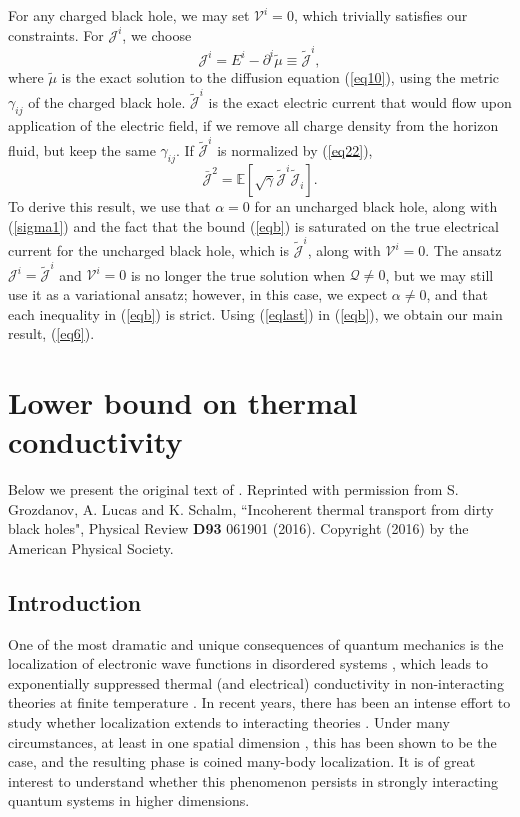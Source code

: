 \documentclass[10pt, oneside]{book}
\begin{document}
\begin{doublespace}
For any charged black hole, we may set $\mathcal{V}^i=0$, which trivially satisfies our constraints.   For $\mathcal{J}^i$, we choose 
\begin{equation}
{\mathcal{J}}^i = E^i - \partial^i  \tilde\mu \equiv \tilde{\mathcal{J}}^i ,  \label{eq33}
\end{equation}
where $\tilde\mu$ is the exact solution to the diffusion equation (\ref{eq10}), using the metric $\gamma_{ij}$ of the charged black hole.    $\tilde{\mathcal{J}}^i$ is the exact electric current that would flow upon application of the electric field, if we remove all charge density from the horizon fluid, but keep the same $\gamma_{ij}$.   
If $\tilde{\mathcal{J}}^i$ is normalized by (\ref{eq22}), \begin{equation}
\bar{\mathcal{J}}^2 = \mathbb{E}\left[\sqrt{\gamma} \tilde{\mathcal{J}}^i\tilde{\mathcal{J}}_{i}\right].  \label{eqlast}
\end{equation}
To derive this result, we use that $\alpha=0$ for an uncharged black hole, along with (\ref{sigma1}) and the fact that the bound (\ref{eqb}) is saturated on the true electrical current for the uncharged black hole, which is $\tilde{\mathcal{J}}^i$, along with $\mathcal{V}^i=0$.   The ansatz $\mathcal{J}^i=\tilde{\mathcal{J}}^i$ and $\mathcal{V}^i=0$ is no longer the true solution when $\mathcal{Q}\ne 0$, but we may still use it as a variational ansatz;  however, in this case, we expect $\alpha\ne 0$, and that each inequality in (\ref{eqb}) is strict.  
Using (\ref{eqlast}) in (\ref{eqb}), we obtain our main result, (\ref{eq6}).


\chapter{Lower bound on thermal conductivity}

Below we present the original text of \cite{Grozdanov2}.  Reprinted with permission from S. Grozdanov, A. Lucas and K. Schalm,  ``Incoherent thermal transport from dirty black holes",  Physical Review \textbf{D93} 061901 (2016).   Copyright (2016) by the American Physical Society.

\section{Introduction}
One of the most dramatic and unique consequences of quantum mechanics is the localization of electronic wave functions in disordered systems \cite{anderson}, which leads to exponentially suppressed thermal (and electrical) conductivity in non-interacting theories at finite temperature \cite{halperin2}.  In recent years, there has been an intense effort to study whether localization extends to interacting theories \cite{basko}.   Under many circumstances, at least in one spatial dimension \cite{huse1, huse2, huse3}, this has been shown to be the case, and the resulting phase is coined many-body localization.  It is of great interest to understand whether this phenomenon persists  in strongly interacting quantum systems in higher dimensions.   


\end{doublespace}
\end{document}
